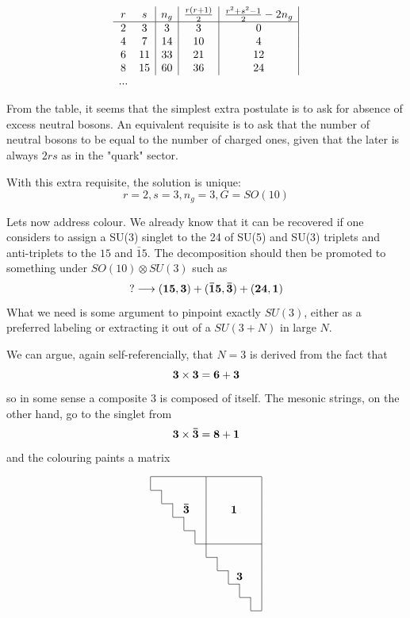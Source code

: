 \documentclass[a4paper]{article}
\newcommand*{\bord}{\multicolumn{1}{c|}{}}
\newcommand*{\nobord}{\multicolumn{1}{c}{}}
\begin{document}
$$
\begin{array}{cc|c|c|c|}
r & s & n_g & {r(r+1)\over 2 } & {r^2+s^2 -1 \over 2} - 2 n_g \\ 
\hline
2 & 3 & 3   &  3  & 0 \\
4 & 7 & 14  & 10  & 4 \\
6 & 11 & 33 & 21  & 12 \\
8 & 15 & 60 & 36 & 24 \\
... \\
\end{array}
$$

From the table, it seems that the simplest extra postulate is to ask
for absence of excess neutral bosons. An equivalent requisite is to
ask that the number of neutral bosons to be equal to the number of 
charged ones, given that the later is always $2 r s$ as in the "quark" 
sector. 
 
 With this extra requisite, the solution is unique:
 $$ r=2, s=3, n_g=3, G=SO(10)$$
 

Lets now address colour. We already know that it can be recovered if one
considers to assign a SU(3) singlet to the 24 of SU(5) and SU(3) triplets and anti-triplets
to the $15$ and $\bar 15$. The decomposition should then be promoted to
something under $SO(10) \otimes SU(3)$ such as
$$ \bf ? \longrightarrow (15,3) + (\bar 15, \bar 3) + (24, 1) $$ 
What we need is some argument to pinpoint exactly $SU(3)$,
either as a preferred labeling or extracting it out of a $SU(3 + N)$ in large $N$.

We can argue, again self-referencially, that $N=3$ is derived from the fact that 
$$ \bf 3 \times 3 = 6 + 3 $$
so in some sense a composite $3$ is composed of itself. The mesonic
strings, on the other hand, go to the singlet from $$ \bf 3 \times \bar 3 = 8 + 1 $$ and the colouring paints a matrix

$${\bf 
\begin{array}{|cccccccccc|c} 
\hline
  &  &    & & \bord   &&&&& \\ \cline{1-1}
 \bord &&  && \bord&&&&& \\ \cline{2-2}
\nobord & \bord &\multicolumn{2}{r}{\bf \bar {3}}&\bord&&\multicolumn{3}{c}{\bf 1} & \\ \cline{3-3} 
\nobord&& \bord && \bord&&&&& \\ \cline{4-4}
\nobord &&& \bord &\bord&&&&& \\ \cline{5-10}
\nobord&&&& \bord &&&&& \\ \cline{6-6}
\nobord&&&&& \bord&&&& \\ \cline{7-7} 
\nobord&&&&&& \bord &\multicolumn{2}{c}{\bf 3}& \\ \cline{8-8} 
\nobord&&&&&&& \bord && \\ \cline{9-9}
\nobord&&&&&&&& \bord & \\    \cline{10-10}  
\end{array}} 
$$
\end{document}
